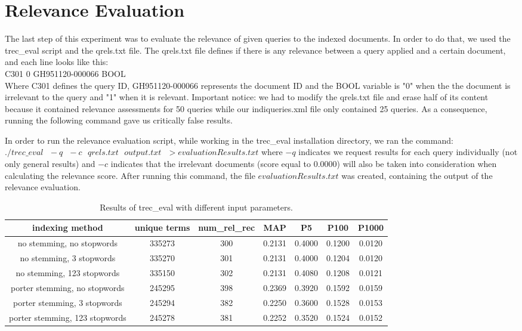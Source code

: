 \documentclass[letterpaper,11pt]{article}
\begin{document}
\section{Relevance Evaluation}

The last step of this experiment was to evaluate the relevance of given queries to the indexed documents. In order to do that, we used the trec\_eval script  and the qrels.txt file. The qrels.txt file defines if there is any relevance between a query applied and a certain document, and each line looks like this: \\

C301 0 GH951120-000066 BOOL\\


Where C301 defines the query ID, GH951120-000066 represents the document ID and the BOOL variable is "0" when the the document is irrelevant to the query and "1" when it is relevant. Important notice: we had to modify the qrels.txt file and erase half of its content because it contained relevance assessments for 50 queries while our indiqueries.xml file only contained 25 queries. As a consequence, running the following command gave us critically false results.

\newpage
In order to run the relevance evaluation script, while working in the trec\_eval installation directory, we ran the command: $./trec\_eval \text{ } -q \text{ } -c \text{ } qrels.txt \text{ } output.txt \text{ }>evaluationResults.txt$ where $-q$ indicates we request results for each query individually (not only general results) and $-c$ indicates that the irrelevant documents (score equal to 0.0000) will also be taken into consideration when calculating the relevance score. After running this command, the file $evaluationResults.txt$ was created, containing the output of the relevance evaluation.




\begin{table}[h]
\begin{center}
\begin{tabular}{ccccccc}
\textbf{ indexing method} & \textbf{unique terms} & \textbf{num\_rel\_rec} & \textbf{MAP} & \textbf{P5} & \textbf{P100} & \textbf{P1000} \\ \hline
no stemming, no stopwords & 335273 & 300 & 0.2131 & 0.4000 & 0.1200 & 0.0120 \\
no stemming, 3 stopwords & 335270 & 301 & 0.2131 & 0.4000 & 0.1204 & 0.0120 \\
no stemming, 123 stopwords & 335150 & 302 & 0.2131 & 0.4080 & 0.1208 & 0.0121 \\
porter stemming, no stopwords & 245295 & 398 & 0.2369 & 0.3920 & 0.1592 & 0.0159 \\
porter stemming, 3 stopwords & 245294 & 382 & 0.2250 & 0.3600 & 0.1528 & 	0.0153 \\
porter stemming, 123 stopwords &  245278 & 381 & 0.2252 & 0.3520 & 0.1524 & 	0.0152 \\	
\end{tabular}
\end{center}
\caption{Results of trec\_eval with different input parameters.}
\end{table}
\end{document}
